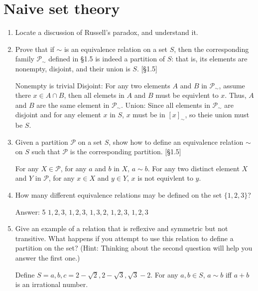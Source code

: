 \section{Naive set theory}
\begin{enumerate}
    \item Locate a discussion of Russell's paradox, and understand it.

    \item Prove that if $\sim$ is an equivalence relation on a set $S$, then the corresponding family $\mathcal{P}_{\sim}$ defined in \S1.5 is indeed a partition of $S$: that is, its elements are nonempty, disjoint, and their union is $S$. [\S1.5]
    \begin{solution}
            Nonempty is trivial
            Disjoint: For any two elements $A$ and $B$ in $\mathcal{P}_{\sim}$, assume there $x\in A\cap B $, then all elemets in $A$ and $B$ must be equivlent to $x$. Thus, $A$ and $B$ are the same element in $\mathcal{P}_{\sim}$. 
            Union: Since all elements in $\mathcal{P}_{\sim}$ are disjoint and for any element $x$ in $S$, $x$ must be in $[x]_{\sim}$, so theie union must be $S$. 
    \end{solution}
    \item Given a partition $\mathcal{P}$ on a set $S$, show how to define an equivalence relation $\sim$ on $S$ such that $\mathcal{P}$ is the corresponding partition. [\S1.5]
        \begin{solution} 
            For any $X \in \mathcal{P}$, for any $a$ and $b$ in $X$, $a\sim b$. 
            For any two distinct element $X$ and $Y$ in $\mathcal{P}$, for any $x\in X$ and $y\in Y$, $x$ is not equivlent to $y$. 
        \end{solution}
    \item How many different equivalence relations may be defined on the set $\{1, 2, 3\}$?
        \begin{solution}
                Answer: 5
                ${{1,2},{3}}$, ${{1}, {2}, {3}}$, ${{1,3},{2}}$, ${{1},{2,3}}$, ${1,2,3}$
        \end{solution}
    \item Give an example of a relation that is reflexive and symmetric but not transitive. What happens if you attempt to use this relation to define a partition on the set? (Hint: Thinking about the second question will help you answer the first one.)
    \begin{solution}
            Define $S={a,b,c}={2-\sqrt{2},2-\sqrt{3},\sqrt{3}-2}$. For any $a,b \in S$, $a\sim b$ iff $a+b$ is an irrational number. 

\end{solution}
\end{enumerate}

